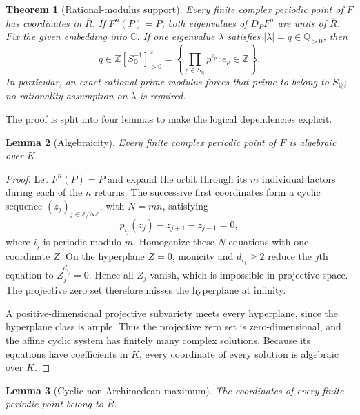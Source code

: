 \documentclass[11pt]{article}
\newtheorem{theorem}{Theorem}[section]
\newtheorem{lemma}[theorem]{Lemma}
\theoremstyle{definition}
\theoremstyle{remark}
\newcommand{\C}{\mathbb C}
\newcommand{\Q}{\mathbb Q}
\newcommand{\Z}{\mathbb Z}
\newcommand{\Rbar}{\overline R}
\newcommand{\SQ}{S_{\Q}}
\begin{document}
\begin{theorem}[Rational-modulus support]
\label{thm:support}
Every finite complex periodic point of $F$ has coordinates in $\Rbar$.  If
$F^n(P)=P$, both eigenvalues of $D_PF^n$ are units of $\Rbar$.  Fix the given
embedding into $\C$.  If one eigenvalue $\lambda$ satisfies
$|\lambda|=q\in\Q_{>0}$, then
\begin{equation}
 q\in\Z[\SQ^{-1}]_{>0}^{\times}
 =\left\{\prod_{p\in\SQ}p^{e_p}:e_p\in\Z\right\}.
 \label{eq:rational-support}
\end{equation}
In particular, an exact rational-prime modulus forces that prime to belong to
$\SQ$; no rationality assumption on $\lambda$ is required.
\end{theorem}

The proof is split into four lemmas to make the logical dependencies explicit.

\begin{lemma}[Algebraicity]
\label{lem:algebraicity}
Every finite complex periodic point of $F$ is algebraic over $K$.
\end{lemma}

\begin{proof}
Let $F^n(P)=P$ and expand the orbit through its $m$ individual factors during
each of the $n$ returns.  The successive first coordinates form a cyclic
sequence $(z_j)_{j\in\Z/N\Z}$, with $N=mn$, satisfying
\begin{equation}
 p_{i_j}(z_j)-z_{j+1}-z_{j-1}=0,
 \label{eq:cyclic-recurrence}
\end{equation}
where $i_j$ is periodic modulo $m$.  Homogenize these $N$ equations with one
coordinate $Z$.  On the hyperplane $Z=0$, monicity and $d_{i_j}\ge2$ reduce
the $j$th equation to $Z_j^{d_{i_j}}=0$.  Hence all $Z_j$ vanish, which is
impossible in projective space.  The projective zero set therefore misses the
hyperplane at infinity.

A positive-dimensional projective subvariety meets every hyperplane, since
the hyperplane class is ample.  Thus the projective zero set is
zero-dimensional, and the affine cyclic system has finitely many complex
solutions.  Because its equations have coefficients in $K$, every coordinate
of every solution is algebraic over $K$.
\end{proof}

\begin{lemma}[Cyclic non-Archimedean maximum]
\label{lem:maximum}
The coordinates of every finite periodic point belong to $\Rbar$.
\end{lemma}
\end{document}
